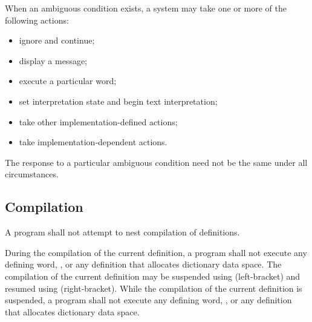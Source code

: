 When an ambiguous condition exists, a system may take one or more
of the following actions:

\begin{itemize}
\item ignore and continue;
\item display a message;
\item execute a particular word;
\item set interpretation state and begin text interpretation;
\item take other implementation-defined actions;
\item take implementation-dependent actions.
\end{itemize}

The response to a particular ambiguous condition need not be the
same under all circumstances.


\subsection{Compilation} %
\label{usage:compilation}

A program shall not attempt to nest compilation of definitions.

During the compilation of the current definition, a program shall
not execute any defining word, , or any definition
that allocates dictionary data space. The compilation of the
current definition may be suspended using \word{[} (left-bracket)
and resumed using \word{]} (right-bracket). While the compilation
of the current definition is suspended, a program shall not execute
any defining word, , or any definition that allocates
dictionary data space.
